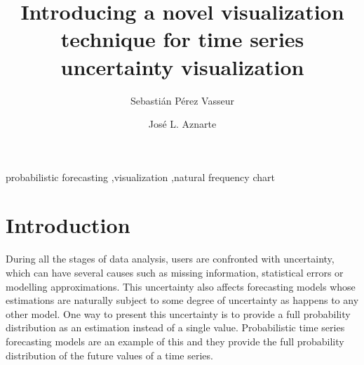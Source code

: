 \documentclass[a4paper,3p,sort&compress]{elsarticle}
\begin{document}
\linenumbers

\newcommand{\no}{NO\textsubscript{2}\xspace}

\begin{frontmatter}

  \title{Introducing a novel visualization technique for time series uncertainty visualization}


  \author{Sebasti\'an P\'erez Vasseur}
  \author{Jos\'e L. Aznarte}
  \address{Artificial Intelligence Department\\Universidad Nacional de
    Educaci\'on a Distancia --- UNED\\c/ Juan del Rosal, 16, Madrid, Spain}
  

\begin{abstract}
  
\end{abstract}

\begin{keyword}
probabilistic forecasting \sep visualization \sep natural frequency chart
\end{keyword}

\end{frontmatter}


\section{Introduction}
\label{sec:intro}

During all the stages of data analysis, users are confronted with uncertainty, which can have 
several causes such as missing information, statistical errors or modelling approximations.
This uncertainty also affects forecasting models whose estimations are naturally 
subject to some degree of uncertainty as happens to any other model. One way to present this 
uncertainty is to provide a full probability distribution as an estimation instead of a single value. 
Probabilistic time series forecasting models are an example of this and they provide the full probability 
distribution of the future values of a time series.
\end{document}
